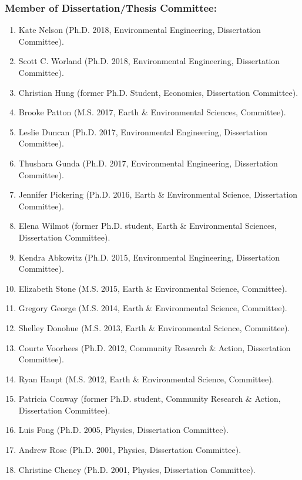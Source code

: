 \documentclass[10pt]{article}
\begin{document}
    \subsubsection{Member of Dissertation/Thesis Committee:}
    \begin{enumerate}
    \item Kate Nelson (Ph.D. 2018, Environmental Engineering, Dissertation Committee).
    \item Scott C. Worland (Ph.D. 2018, Environmental Engineering, Dissertation Committee).
    \item Christian Hung (former Ph.D. Student, Economics, Dissertation Committee).
    \item Brooke Patton (M.S. 2017, Earth \& Environmental Sciences, Committee).
    \item Leslie Duncan (Ph.D. 2017, Environmental Engineering, Dissertation Committee).
    \item Thushara Gunda (Ph.D. 2017, Environmental Engineering, Dissertation Committee).
    \item Jennifer Pickering (Ph.D. 2016, Earth \& Environmental Science, Dissertation Committee).
    \item Elena Wilmot (former Ph.D. student, Earth \& Environmental Sciences, Dissertation Committee).
    \item Kendra Abkowitz (Ph.D. 2015, Environmental Engineering, Dissertation Committee).
    \item Elizabeth Stone (M.S. 2015, Earth \& Environmental Science, Committee).
    \item Gregory George (M.S. 2014, Earth \& Environmental Science, Committee).
    \item Shelley Donohue (M.S. 2013, Earth \& Environmental Science, Committee).
    \item Courte Voorhees (Ph.D. 2012,  Community Research \& Action, Dissertation Committee).
    \item Ryan Haupt (M.S. 2012, Earth \& Environmental Science, Committee).
    \item Patricia Conway (former Ph.D. student, Community Research \& Action, Dissertation Committee).
    \item Luis Fong (Ph.D. 2005, Physics, Dissertation Committee).
    \item Andrew Rose (Ph.D. 2001, Physics, Dissertation Committee).
    \item Christine Cheney (Ph.D. 2001, Physics, Dissertation Committee).
    \end{enumerate}
\end{document}
